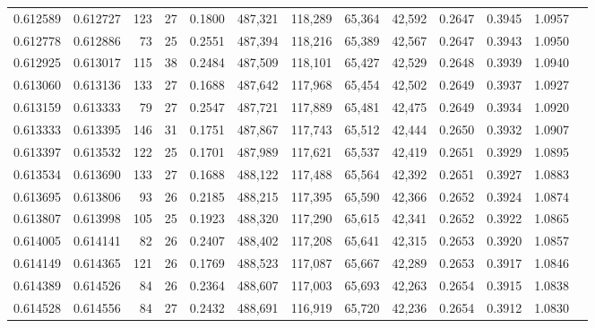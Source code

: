 \begin{tabular}{rrrrrrrrrrrrr}
0.612589 & 0.612727 &    123 &    27 &                                     0.1800 & 487,321 & 118,289 &  65,364 &  42,592 & 0.2647 & 0.3945 & 1.0957 \\
0.612778 & 0.612886 &     73 &    25 &                                     0.2551 & 487,394 & 118,216 &  65,389 &  42,567 & 0.2647 & 0.3943 & 1.0950 \\
0.612925 & 0.613017 &    115 &    38 &                                     0.2484 & 487,509 & 118,101 &  65,427 &  42,529 & 0.2648 & 0.3939 & 1.0940 \\
0.613060 & 0.613136 &    133 &    27 &                                     0.1688 & 487,642 & 117,968 &  65,454 &  42,502 & 0.2649 & 0.3937 & 1.0927 \\
0.613159 & 0.613333 &     79 &    27 &                                     0.2547 & 487,721 & 117,889 &  65,481 &  42,475 & 0.2649 & 0.3934 & 1.0920 \\
0.613333 & 0.613395 &    146 &    31 &                                     0.1751 & 487,867 & 117,743 &  65,512 &  42,444 & 0.2650 & 0.3932 & 1.0907 \\
0.613397 & 0.613532 &    122 &    25 &                                     0.1701 & 487,989 & 117,621 &  65,537 &  42,419 & 0.2651 & 0.3929 & 1.0895 \\
0.613534 & 0.613690 &    133 &    27 &                                     0.1688 & 488,122 & 117,488 &  65,564 &  42,392 & 0.2651 & 0.3927 & 1.0883 \\
0.613695 & 0.613806 &     93 &    26 &                                     0.2185 & 488,215 & 117,395 &  65,590 &  42,366 & 0.2652 & 0.3924 & 1.0874 \\
0.613807 & 0.613998 &    105 &    25 &                                     0.1923 & 488,320 & 117,290 &  65,615 &  42,341 & 0.2652 & 0.3922 & 1.0865 \\
0.614005 & 0.614141 &     82 &    26 &                                     0.2407 & 488,402 & 117,208 &  65,641 &  42,315 & 0.2653 & 0.3920 & 1.0857 \\
0.614149 & 0.614365 &    121 &    26 &                                     0.1769 & 488,523 & 117,087 &  65,667 &  42,289 & 0.2653 & 0.3917 & 1.0846 \\
0.614389 & 0.614526 &     84 &    26 &                                     0.2364 & 488,607 & 117,003 &  65,693 &  42,263 & 0.2654 & 0.3915 & 1.0838 \\
0.614528 & 0.614556 &     84 &    27 &                                     0.2432 & 488,691 & 116,919 &  65,720 &  42,236 & 0.2654 & 0.3912 & 1.0830 \\

\end{tabular}
